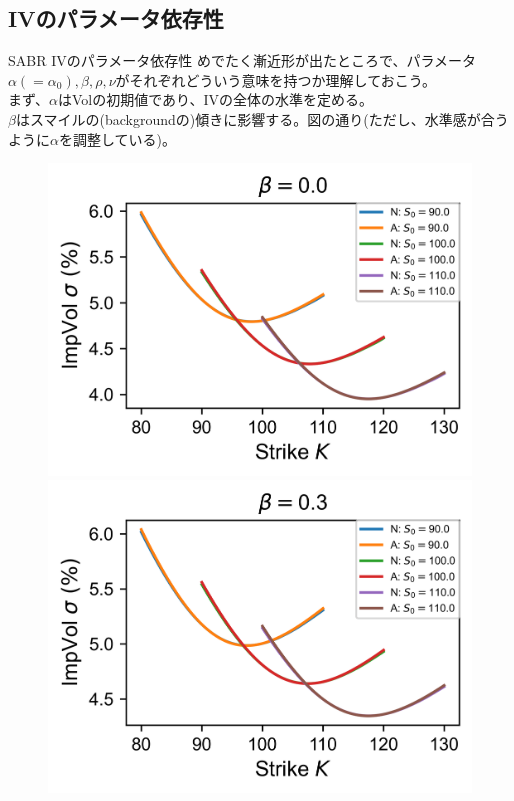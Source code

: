 \documentclass[dvipdfmx,9pt]{beamer}
\begin{document}
\subsection{IVのパラメータ依存性}
\begin{frame}{SABR IVのパラメータ依存性}
  めでたく漸近形が出たところで、パラメータ$\alpha(=\alpha_{0}),\beta,\rho,\nu$がそれぞれどういう意味を持つか理解しておこう。\\
  まず、$\alpha$はVolの初期値であり、IVの全体の水準を定める。\\
  $\beta$はスマイルの(backgroundの)傾きに影響する。図の通り(ただし、水準感が合うように$\alpha$を調整している)。

  \begin{figure}
    \begin{minipage}[b]{0.48\linewidth}
      \raggedleft
      \includegraphics[width=0.7\linewidth]{image/beta/SABR_graph_0.0.png}
    \end{minipage}
    \hfill
    \begin{minipage}[b]{0.48\linewidth}
      \raggedright
      \includegraphics[width=0.7\linewidth]{image/beta/SABR_graph_0.3.png}
    \end{minipage}
  \end{figure}


\end{frame}
\end{document}
